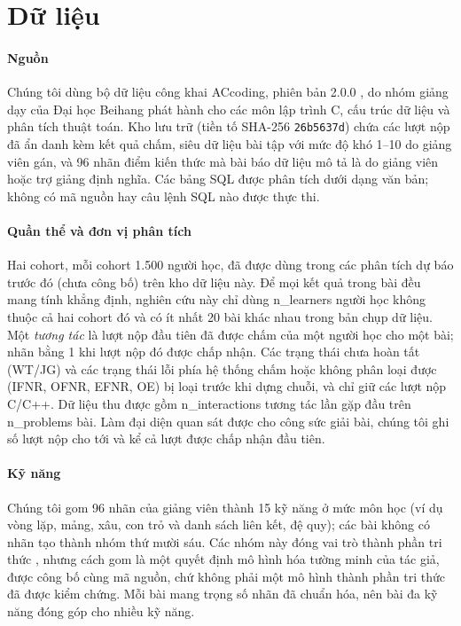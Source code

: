 \section{Dữ liệu}\label{sec:data}

\paragraph{Nguồn} Chúng tôi dùng bộ dữ liệu công khai ACcoding, phiên bản 2.0.0 \citep{chen2024accoding,sun2026accodingdata}, do nhóm giảng dạy của Đại học Beihang phát hành cho các môn lập trình C, cấu trúc dữ liệu và phân tích thuật toán. Kho lưu trữ (tiền tố SHA-256 \texttt{26b5637d}) chứa các lượt nộp đã ẩn danh kèm kết quả chấm, siêu dữ liệu bài tập với mức độ khó 1--10 do giảng viên gán, và 96 nhãn điểm kiến thức mà bài báo dữ liệu mô tả là do giảng viên hoặc trợ giảng định nghĩa. Các bảng SQL được phân tích dưới dạng văn bản; không có mã nguồn hay câu lệnh SQL nào được thực thi.

\paragraph{Quần thể và đơn vị phân tích} Hai cohort, mỗi cohort 1.500 người học, đã được dùng trong các phân tích dự báo trước đó (chưa công bố) trên kho dữ liệu này. Để mọi kết quả trong bài đều mang tính khẳng định, nghiên cứu này chỉ dùng {{n_learners}} người học không thuộc cả hai cohort đó và có ít nhất 20 bài khác nhau trong bản chụp dữ liệu. Một \emph{tương tác} là lượt nộp đầu tiên đã được chấm của một người học cho một bài; nhãn bằng 1 khi lượt nộp đó được chấp nhận. Các trạng thái chưa hoàn tất (WT/JG) và các trạng thái lỗi phía hệ thống chấm hoặc không phân loại được (IFNR, OFNR, EFNR, OE) bị loại trước khi dựng chuỗi, và chỉ giữ các lượt nộp C/C++. Dữ liệu thu được gồm {{n_interactions}} tương tác lần gặp đầu trên {{n_problems}} bài. Làm đại diện quan sát được cho công sức giải bài, chúng tôi ghi số lượt nộp cho tới và kể cả lượt được chấp nhận đầu tiên.

\paragraph{Kỹ năng} Chúng tôi gom 96 nhãn của giảng viên thành 15 kỹ năng ở mức môn học (ví dụ vòng lặp, mảng, xâu, con trỏ và danh sách liên kết, đệ quy); các bài không có nhãn tạo thành nhóm thứ mười sáu. Các nhóm này đóng vai trò thành phần tri thức \citep{koedinger2012kli}, nhưng cách gom là một quyết định mô hình hóa tường minh của tác giả, được công bố cùng mã nguồn, chứ không phải một mô hình thành phần tri thức đã được kiểm chứng. Mỗi bài mang trọng số nhãn đã chuẩn hóa, nên bài đa kỹ năng đóng góp cho nhiều kỹ năng.

